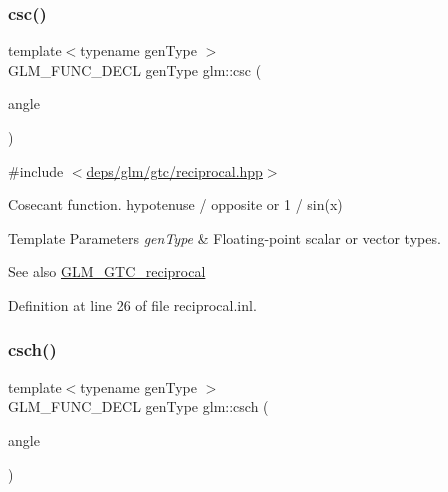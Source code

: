 \mbox{\label{group__gtc__reciprocal_ga59dd0005b6474eea48af743b4f14ebbb}} 
\subsubsection{\texorpdfstring{csc()}{csc()}}
{\footnotesize\ttfamily template$<$typename gen\+Type $>$ \\
G\+L\+M\+\_\+\+F\+U\+N\+C\+\_\+\+D\+E\+CL gen\+Type glm\+::csc (\begin{DoxyParamCaption}\item[{gen\+Type}]{angle }\end{DoxyParamCaption})}



{\ttfamily \#include $<$\hyperlink{reciprocal_8hpp}{deps/glm/gtc/reciprocal.\+hpp}$>$}

Cosecant function. hypotenuse / opposite or 1 / sin(x)


\begin{DoxyTemplParams}{Template Parameters}
{\em gen\+Type} & Floating-\/point scalar or vector types.\\
\hline
\end{DoxyTemplParams}
\begin{DoxySeeAlso}{See also}
\hyperlink{group__gtc__reciprocal}{G\+L\+M\+\_\+\+G\+T\+C\+\_\+reciprocal} 
\end{DoxySeeAlso}


Definition at line 26 of file reciprocal.\+inl.

\mbox{\label{group__gtc__reciprocal_ga6d95843ff3ca6472ab399ba171d290a0}} 
\subsubsection{\texorpdfstring{csch()}{csch()}}
{\footnotesize\ttfamily template$<$typename gen\+Type $>$ \\
G\+L\+M\+\_\+\+F\+U\+N\+C\+\_\+\+D\+E\+CL gen\+Type glm\+::csch (\begin{DoxyParamCaption}\item[{gen\+Type}]{angle }\end{DoxyParamCaption})}



